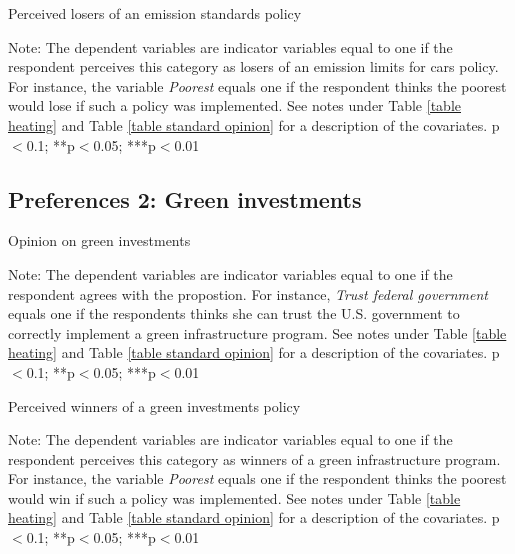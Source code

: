 \documentclass{article}
\begin{document}
\begin{table}[h!]
	\caption{Perceived losers of an emission standards policy}
	\begin{center}
		\scalebox{0.7}{}
	\end{center}
	{\footnotesize Note: The dependent variables are indicator variables equal to one if the respondent perceives this category as losers of an emission limits for cars policy. For instance, the variable \textit{Poorest} equals one if the respondent thinks the poorest would lose if such a policy was implemented. See notes under Table \ref{table heating} and Table \ref{table standard opinion} for a description of the covariates.
	\newline *p$<$0.1; **p$<$0.05; ***p$<$0.01}
\end{table}	

\clearpage
\subsection{Preferences 2: Green investments}

\begin{table}[h!]
	\caption{Opinion on green investments}
	\begin{center}
		\scalebox{0.7}{}
	\end{center}
	{\footnotesize Note: The dependent variables are indicator variables equal to one if the respondent agrees with the propostion. For instance, \textit{Trust federal government} equals one if the respondents thinks she can trust the U.S. government to correctly implement a green infrastructure program. See notes under Table \ref{table heating} and Table \ref{table standard opinion} for a description of the covariates.
	\newline *p$<$0.1; **p$<$0.05; ***p$<$0.01}
\end{table}	

\begin{table}[h!]
	\caption{Perceived winners of a green investments policy}
	\begin{center}
		\scalebox{0.7}{}
	\end{center}
	{\footnotesize Note: The dependent variables are indicator variables equal to one if the respondent perceives this category as winners of a green infrastructure program. For instance, the variable \textit{Poorest} equals one if the respondent thinks the poorest would win if such a policy was implemented. See notes under Table \ref{table heating} and Table \ref{table standard opinion} for a description of the covariates.
	\newline *p$<$0.1; **p$<$0.05; ***p$<$0.01}
\end{table}	
\end{document}
